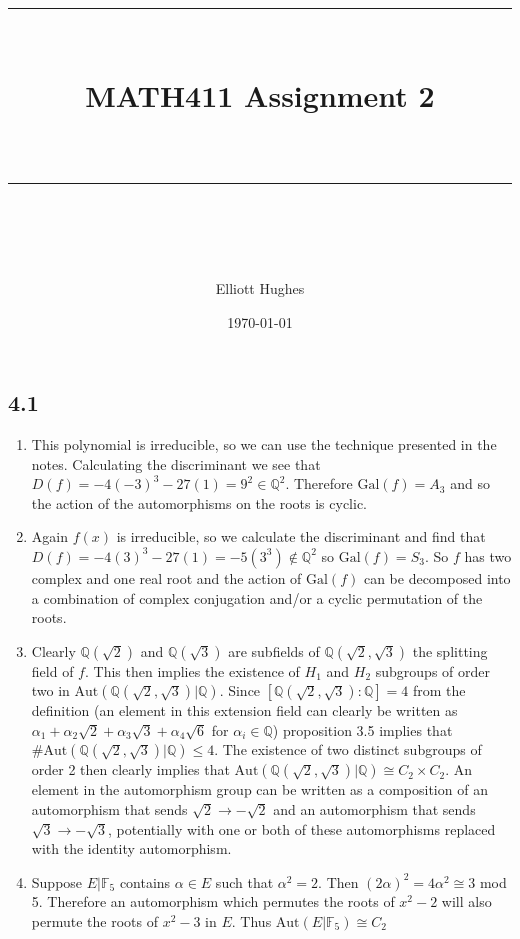 \documentclass{article}
\title{	
	\normalfont\normalsize 
	\rule{\linewidth}{0.5pt}\\ %
	\vspace{14pt} %
	{\LARGE MATH411 Assignment 2\\ %
    \large \textit{} \\}
	\vspace{6pt} %
	\rule{\linewidth}{1pt}\\ %
}
\author{Elliott Hughes}
\date{\normalsize\today}
\begin{document}
\maketitle

\subsection*{4.1}
\begin{enumerate}
    \item This polynomial is irreducible, so we can use the technique presented in the notes. Calculating the discriminant we see that $D(f) = -4(-3)^3 - 27(1) = 9^2 \in \mathbb{Q}^2$. Therefore $\text{Gal}(f) = A_3$ 
    and so the action of the automorphisms on the roots is cyclic.
    \item Again $f(x)$ is irreducible, so we calculate the discriminant and find that $D(f) = -4(3)^3 - 27(1) = -5(3^3) \notin \mathbb{Q}^2$ so $\text{Gal}(f) = S_3$. 
    So $f$ has two complex and one real root and the action of $\text{Gal}(f)$ can be decomposed 
    into a combination of complex conjugation and/or a cyclic permutation of the roots.
    \item Clearly $\mathbb{Q}(\sqrt{2})$ and $\mathbb{Q}(\sqrt{3})$ are subfields of $\mathbb{Q}(\sqrt{2},\sqrt{3})$ 
    the splitting field of $f$. This then implies the existence of $H_1$ and $H_2$ subgroups of 
    order two in $\text{Aut}(\mathbb{Q}(\sqrt{2},\sqrt{3})|\mathbb{Q})$. Since $[\mathbb{Q}(\sqrt{2},\sqrt{3}):\mathbb{Q}] = 4$ 
    from the definition (an element in this extension field can clearly be written as $\alpha_1 + \alpha_2\sqrt{2} + \alpha_3\sqrt{3} + \alpha_4\sqrt{6}$ 
    for $\alpha_i \in \mathbb{Q}$) proposition 3.5 implies that $\#\text{Aut}(\mathbb{Q}(\sqrt{2},\sqrt{3})|\mathbb{Q}) \leq 4$. 
    The existence of two distinct subgroups of order 2 then clearly implies that $\text{Aut}(\mathbb{Q}(\sqrt{2},\sqrt{3})|\mathbb{Q}) \cong C_2 \times C_2$. 
    An element in the automorphism group can be written as a composition of an automorphism that sends 
    $\sqrt{2} \rightarrow -\sqrt{2}$ and an automorphism that sends $\sqrt{3} \rightarrow -\sqrt{3}$, 
    potentially with one or both of these automorphisms replaced with the identity automorphism.
    \item Suppose $E|\mathbb{F}_5$ contains $\alpha \in E$ such that $\alpha^2 =2$. Then 
    $(2\alpha)^2 = 4\alpha^2 \cong 3$ mod 5. Therefore an automorphism which permutes the roots of 
    $x^2 -2$ will also permute the roots of $x^2 -3$ in $E$. Thus $\text{Aut}(E|\mathbb{F}_5) \cong C_2$ 

\end{enumerate}
\end{document}
